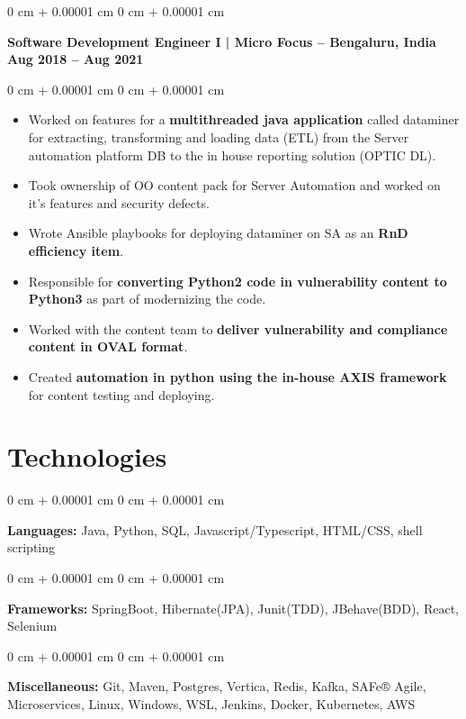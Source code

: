 \documentclass[10pt, letterpaper]{article}
\newenvironment{highlights}{
    \begin{itemize}[
        topsep=0.10 cm,
        parsep=0.10 cm,
        partopsep=0pt,
        itemsep=0pt,
        leftmargin=0 cm + 10pt
    ]
}{
    \end{itemize}
} %
\newenvironment{onecolentry}{
    \begin{adjustwidth}{
        0 cm + 0.00001 cm
    }{
        0 cm + 0.00001 cm
    }
}{
    \end{adjustwidth}
} %
\newenvironment{twocolentry}[2][]{
    \onecolentry
    \def\secondColumn{#2}
    \setcolumnwidth{\fill, 4.5 cm}
    \begin{paracol}{2}
}{
    \switchcolumn \raggedleft \secondColumn
    \end{paracol}
    \endonecolentry
} %
\begin{document}
        \vspace{0.5 cm}

        \begin{twocolentry}{
            \textbf{Aug 2018 – Aug 2021}
        }
            {\textbf{{\color{MidnightBlue}Software Development Engineer I} |  Micro Focus -- Bengaluru, India}}\end{twocolentry}
        \vspace{0.10 cm}

        \vspace{0.10 cm}
         \begin{onecolentry}
            \begin{highlights}
                \item Worked on features for a \textbf{multithreaded java application} called dataminer for extracting, transforming and loading data (ETL) from the Server automation platform DB to the in house reporting solution (OPTIC DL).
                \item Took ownership of OO content pack for Server Automation and worked on it's features and security defects.
                \item Wrote Ansible playbooks for deploying dataminer on SA as an \textbf{RnD efficiency item}.
                \item Responsible for \textbf{converting Python2 code in vulnerability content to Python3} as part of modernizing the code.
                \item Worked with the content team to \textbf{deliver vulnerability and compliance content in OVAL format}.
                \item Created \textbf{automation in python using the in-house AXIS framework} for content testing and deploying.
            \end{highlights}
        \end{onecolentry}

    \section{Technologies}    
        \begin{onecolentry}
            \textbf{Languages:} Java, Python, SQL, Javascript/Typescript, HTML/CSS, shell scripting
        \end{onecolentry}
        \begin{onecolentry}
            \textbf{Frameworks:} SpringBoot, Hibernate(JPA), Junit(TDD), JBehave(BDD), React, Selenium
        \end{onecolentry}
        \begin{onecolentry}
            \textbf{Miscellaneous:} Git, Maven, Postgres, Vertica, Redis, Kafka, SAFe® Agile, Microservices, Linux, Windows, WSL, Jenkins, Docker, Kubernetes, AWS
        \end{onecolentry}
\end{document}
